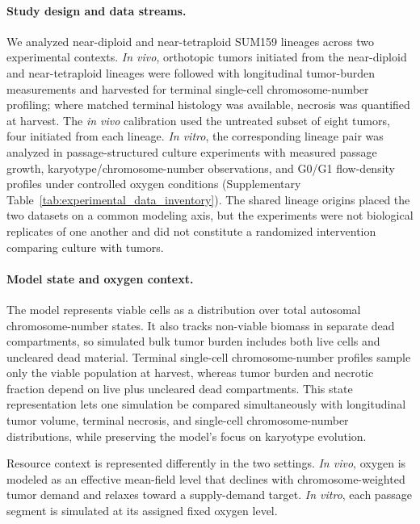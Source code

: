 \documentclass[11pt]{article}
\begin{document}
\paragraph{Study design and data streams.}
We analyzed near-diploid and near-tetraploid SUM159 lineages across two experimental contexts. \textit{In vivo}, orthotopic tumors initiated from the near-diploid and near-tetraploid lineages were followed with longitudinal tumor-burden measurements and harvested for terminal single-cell chromosome-number profiling; where matched terminal histology was available, necrosis was quantified at harvest. The \textit{in vivo} calibration used the untreated subset of eight tumors, four initiated from each lineage. \textit{In vitro}, the corresponding lineage pair was analyzed in passage-structured culture experiments with measured passage growth, karyotype/chromosome-number observations, and G0/G1 flow-density profiles under controlled oxygen conditions (Supplementary Table~\ref{tab:experimental_data_inventory}). The shared lineage origins placed the two datasets on a common modeling axis, but the experiments were not biological replicates of one another and did not constitute a randomized intervention comparing culture with tumors.

\paragraph{Model state and oxygen context.}
The model represents viable cells as a distribution over total autosomal chromosome-number states. It also tracks non-viable biomass in separate dead compartments, so simulated bulk tumor burden includes both live cells and uncleared dead material. Terminal single-cell chromosome-number profiles sample only the viable population at harvest, whereas tumor burden and necrotic fraction depend on live plus uncleared dead compartments. This state representation lets one simulation be compared simultaneously with longitudinal tumor volume, terminal necrosis, and single-cell chromosome-number distributions, while preserving the model's focus on karyotype evolution.

Resource context is represented differently in the two settings. \textit{In vivo}, oxygen is modeled as an effective mean-field level that declines with chromosome-weighted tumor demand and relaxes toward a supply-demand target. \textit{In vitro}, each passage segment is simulated at its assigned fixed oxygen level.
\end{document}
